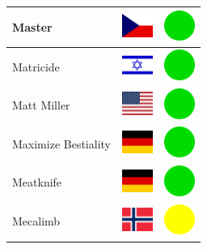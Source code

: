 \documentclass[12pt, a4paper, twoside]{report}
\begin{document}
\begin{center}
\begin{longtable}{|p{5cm}|p{2cm}|p{2cm}|}
 Master                                                     & \includegraphics[width=1cm]{../4x3/cz} &   \includegraphics[width=1cm]{../likes/y} \\ \hline
 Matricide                                                  & \includegraphics[width=1cm]{../4x3/il} &   \includegraphics[width=1cm]{../likes/y} \\ \hline
 Matt Miller                                                & \includegraphics[width=1cm]{../4x3/us} &   \includegraphics[width=1cm]{../likes/y} \\ \hline
 Maximize Bestiality                                        & \includegraphics[width=1cm]{../4x3/de} &   \includegraphics[width=1cm]{../likes/y} \\ \hline
 Meatknife                                                  & \includegraphics[width=1cm]{../4x3/de} &   \includegraphics[width=1cm]{../likes/y} \\ \hline
 Mecalimb                                                   & \includegraphics[width=1cm]{../4x3/no} &   \includegraphics[width=1cm]{../likes/m} \\ \hline

\end{longtable}
\end{center}
\end{document}
